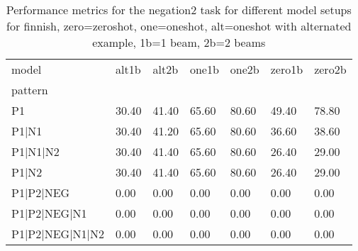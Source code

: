 \begin{table}[h]
\begin{tabular}{l|llllll}
\toprule
model & alt1b & alt2b & one1b & one2b & zero1b & zero2b \\
pattern &  &  &  &  &  &  \\
\midrule
P1 & 30.40 & 41.40 & 65.60 & 80.60 & 49.40 & 78.80 \\
P1|N1 & 30.40 & 41.20 & 65.60 & 80.60 & 36.60 & 38.60 \\
P1|N1|N2 & 30.40 & 41.40 & 65.60 & 80.60 & 26.40 & 29.00 \\
P1|N2 & 30.40 & 41.40 & 65.60 & 80.60 & 26.40 & 29.00 \\
P1|P2|NEG & 0.00 & 0.00 & 0.00 & 0.00 & 0.00 & 0.00 \\
P1|P2|NEG|N1 & 0.00 & 0.00 & 0.00 & 0.00 & 0.00 & 0.00 \\
P1|P2|NEG|N1|N2 & 0.00 & 0.00 & 0.00 & 0.00 & 0.00 & 0.00 \\
\bottomrule
\end{tabular}
\caption{Performance metrics for the negation2 task for different model setups for finnish, zero=zeroshot, one=oneshot, alt=oneshot with alternated example, 1b=1 beam, 2b=2 beams}
\label{tab:fi_negation2_performance}
\end{table}
